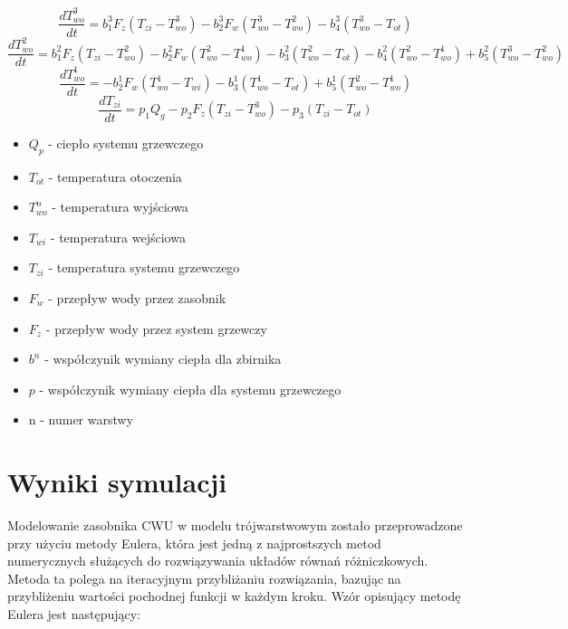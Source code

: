 \documentclass[a4paper,twoside,12pt]{book}
\begin{document}
\begin{equation}
  \frac{dT_{wo}^{3}}{dt} = b_1^3 F_z (T_{zi} - T_{wo}^{3}) - b_2^3 F_w (T_{wo}^{3} - T_{wo}^{2}) - b_4^3 (T_{wo}^{3} - T_{ot})
\end{equation}
\begin{equation}
  \frac{dT_{wo}^{2}}{dt} = b_1^2 F_z (T_{zi} - T_{wo}^{2}) - b_2^2 F_w (T_{wo}^{2} - T_{wo}^{1}) - b_3^2 (T_{wo}^{2} - T_{ot}) - b_4^2 (T_{wo}^{2} - T_{wo}^{1}) + b_5^2 (T_{wo}^{3} - T_{wo}^{2})
\end{equation}
\begin{equation}
  \frac{dT_{wo}^{1}}{dt} = -b_2^1 F_w (T_{wo}^{1} - T_{wi}) - b_3^1 (T_{wo}^{1} - T_{ot}) + b_5^1 (T_{wo}^{2} - T_{wo}^{1})
\end{equation}
\begin{equation}
  \frac{dT_{zi}}{dt} = p_1 Q_g - p_2 F_z (T_{zi} - T_{wo}^{3}) - p_3 (T_{zi} - T_{ot})
\end{equation}

\begin{itemize}
  \item $Q_p$ - ciepło systemu grzewczego
  \item $T_{ot}$ - temperatura otoczenia
  \item $T_{wo}^n$ - temperatura wyjściowa
  \item $T_{wi}$ - temperatura wejściowa
  \item $T_{zi}$ - temperatura systemu grzewczego
  \item $F_{w}$ - przepływ wody przez zasobnik
  \item $F_{z}$ - przepływ wody przez system grzewczy
  \item $b^n$ - współczynik wymiany ciepła dla zbirnika
  \item $p$ - współczynik wymiany ciepła dla systemu grzewczego
  \item n - numer warstwy
\end{itemize}


\newpage
\section{Wyniki symulacji}
Modelowanie zasobnika CWU w modelu trójwarstwowym zostało przeprowadzone przy użyciu metody Eulera, która jest jedną z najprostszych metod numerycznych służących do rozwiązywania układów równań różniczkowych. Metoda ta polega na iteracyjnym przybliżaniu rozwiązania, bazując na przybliżeniu wartości pochodnej funkcji w każdym kroku.
Wzór opisujący metodę Eulera jest następujący:
\end{document}
